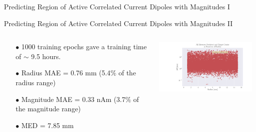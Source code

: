\documentclass[aspectratio=169, 9pt]{beamer}
\begin{document}
\begin{frame}{Predicting Region of Active Correlated Current Dipoles with Magnitudes I}

\end{frame}


\begin{frame}{Predicting Region of Active Correlated Current Dipoles with Magnitudes II}
  \begin{columns}
    \begin{column}{0.5\textwidth}
      \begin{itemize}
      \item[$\bullet$] 1000 training epochs gave a training time of $\sim$ 9.5 hours.
      \item[$\bullet$] Radius MAE = 0.76 mm (5.4$\%$ of the radius range)
      \item[$\bullet$] Magnitude MAE = 0.33 nAm (3.7$\%$ of the magnitude range)
      \item[$\bullet$] MED = 7.85 mm
    \end{itemize}
    \end{column}
    \begin{column}{0.5\textwidth}
      \includegraphics[width=7cm]{figures/mae_area.pdf}
    \end{column}
  \end{columns}
\end{frame}
\end{document}
